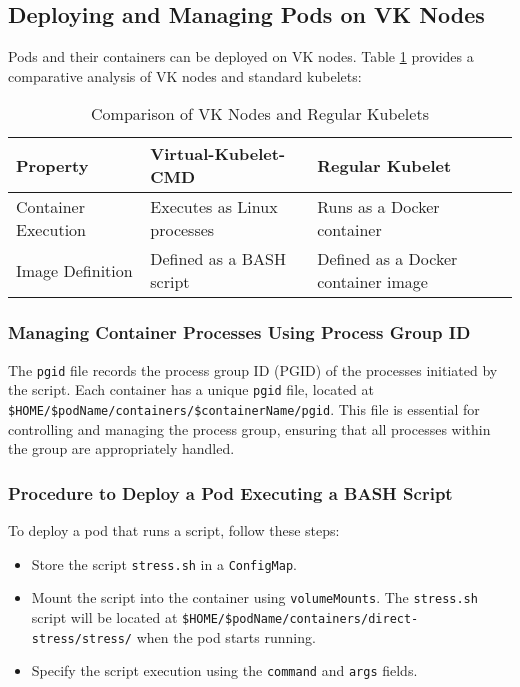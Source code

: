 \subsection{Deploying and Managing Pods on VK Nodes}
\label{deploying-pods}

Pods and their containers can be deployed on VK nodes. Table \ref{table:vk_vs_kubelet} provides a comparative analysis of VK nodes and standard kubelets:

\begin{table}[h!]
\centering
\caption{Comparison of VK Nodes and Regular Kubelets}
\begin{tabular}{|l|l|l|}
\hline
\textbf{Property} & \textbf{Virtual-Kubelet-CMD} & \textbf{Regular Kubelet} \\
\hline
Container Execution & Executes as Linux processes & Runs as a Docker container \\
\hline
Image Definition & Defined as a BASH script & Defined as a Docker container image \\
\hline
\end{tabular}
\label{table:vk_vs_kubelet}
\end{table}

\subsubsection{Managing Container Processes Using Process Group ID}

The \texttt{pgid} file records the process group ID (PGID) of the processes initiated by the script. Each container has a unique \texttt{pgid} file, located at \texttt{\$HOME/\$podName/containers/\$containerName/pgid}. This file is essential for controlling and managing the process group, ensuring that all processes within the group are appropriately handled.

\subsubsection{Procedure to Deploy a Pod Executing a BASH Script}

To deploy a pod that runs a script, follow these steps:

\begin{itemize}
    \item Store the script \texttt{stress.sh} in a \texttt{ConfigMap}.
    \item Mount the script into the container using \texttt{volumeMounts}. The \texttt{stress.sh} script will be located at \texttt{\$HOME/\$podName/containers/direct-stress/stress/} when the pod starts running.
    \item Specify the script execution using the \texttt{command} and \texttt{args} fields.
\end{itemize}

